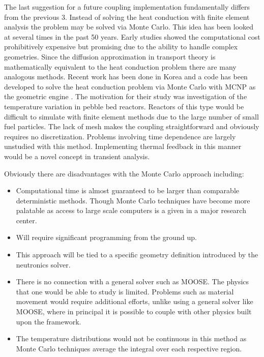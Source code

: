 \documentclass[11pt]{article}
\begin{document}
The last suggestion for a future coupling implementation  fundamentally differs from the previous 3.  Instead of solving the heat conduction  with finite element analysis the problem may be solved via Monte Carlo.  This idea has been looked at several times in the past 50 years\cite{fraley1980monte, hoffman1976monte, haji1967solution}.  Early studies showed the computational cost prohibitively  expensive but promising due to the ability to handle complex geometries.  Since the diffusion approximation in transport theory is mathematically equivalent to the heat conduction problem there are many analogous methods. Recent work has been done in Korea and a code has been developed to solve the heat conduction problem via Monte Carlo with MCNP as the geometric engine  \cite{song2007improved}.  The motivation for their study was investigation of the temperature variation in pebble bed reactors.  Reactors of this type would be difficult to simulate with finite element methods due to the large number of small fuel particles.  The lack of mesh makes the coupling straightforward and obviously requires no discretization. Problems involving time dependence are largely unstudied with this method.  Implementing thermal feedback in this manner would be a novel concept in transient analysis.

Obviously there are disadvantages with the Monte Carlo approach including:
	\begin{itemize}
	\item Computational time is almost guaranteed to be larger than comparable deterministic methods.  Though Monte Carlo techniques have become more palatable as access to large scale computers is a given in a major research center.
	\item Will  require significant programming from the ground up. 
	\item  This approach will be tied to a specific geometry definition introduced by the neutronics solver.  
	\item  There is no connection with a general solver such as MOOSE.  The physics that one would be able to study is limited.  Problems such as material movement would require additional efforts, unlike using a general solver like MOOSE, where in principal it is possible to couple with other physics built upon the framework.
	\item The temperature distributions would not be continuous in this method as Monte Carlo techniques average the integral over each respective region.
	\end{itemize}
\end{document}
